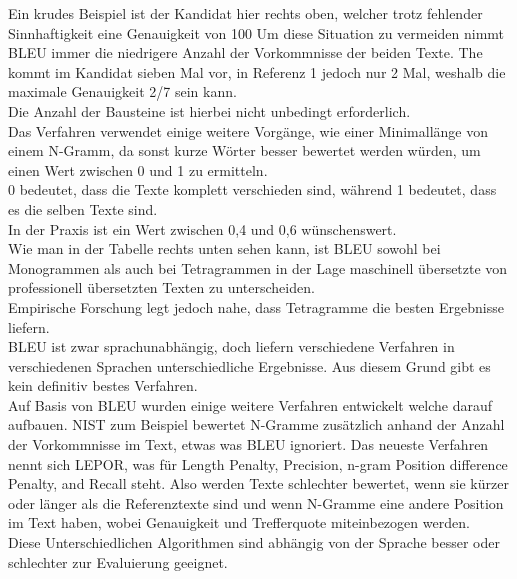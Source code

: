 \documentclass{article}
\begin{document}
Ein krudes Beispiel ist der Kandidat hier rechts oben, welcher trotz fehlender Sinnhaftigkeit eine Genauigkeit von 100%
Um diese Situation zu vermeiden nimmt BLEU immer die niedrigere Anzahl der Vorkommnisse der beiden Texte. The kommt im Kandidat sieben Mal vor, in Referenz 1 jedoch nur 2 Mal, weshalb die maximale Genauigkeit 2/7 sein kann.\\
Die Anzahl der Bausteine ist hierbei nicht unbedingt erforderlich. \\
Das Verfahren verwendet einige weitere Vorgänge, wie einer Minimallänge von einem N-Gramm, da sonst kurze Wörter besser bewertet werden würden, um einen Wert zwischen 0 und 1 zu ermitteln. \\
0 bedeutet, dass die Texte komplett verschieden sind, während 1 bedeutet, dass es die selben Texte sind.\\
In der Praxis ist ein Wert zwischen 0,4 und 0,6 wünschenswert.\\
Wie man in der Tabelle rechts unten sehen kann, ist BLEU sowohl bei Monogrammen als auch bei Tetragrammen in der Lage maschinell übersetzte von professionell übersetzten Texten zu unterscheiden.  \\
Empirische Forschung legt jedoch nahe, dass Tetragramme die besten Ergebnisse liefern. \\
BLEU ist zwar sprachunabhängig, doch liefern verschiedene Verfahren in verschiedenen Sprachen unterschiedliche Ergebnisse. Aus diesem Grund gibt es kein definitiv bestes Verfahren. \\
Auf Basis von BLEU wurden einige weitere Verfahren entwickelt welche darauf aufbauen. NIST zum Beispiel bewertet N-Gramme zusätzlich anhand der Anzahl der Vorkommnisse im Text, etwas was BLEU ignoriert. Das neueste Verfahren nennt sich LEPOR, was für Length Penalty, Precision, n-gram Position difference Penalty, and Recall steht. Also werden Texte schlechter bewertet, wenn sie kürzer oder länger als die Referenztexte sind und wenn N-Gramme eine andere Position im Text haben, wobei Genauigkeit und Trefferquote miteinbezogen werden. \\
Diese Unterschiedlichen Algorithmen sind abhängig von der Sprache besser oder schlechter zur Evaluierung geeignet. \\
\end{document}
